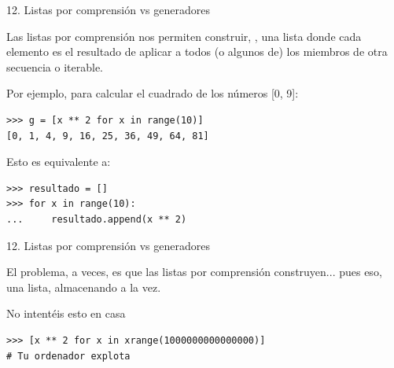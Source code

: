 \documentclass[14pt]{beamer}
\begin{document}
\begin{frame}[fragile]
  {\large 12. Listas por comprensión vs generadores}
  \begin{block}{}
    \small
    \centering
    Las listas por comprensión nos permiten construir, , una lista donde cada elemento es el resultado de
    aplicar  a todos (o algunos de) los
    miembros de otra secuencia o iterable.
  \end{block}

  \footnotesize
  \begin{exampleblock}
    {Por ejemplo, para calcular el cuadrado de los números [0, 9]:}
    \begin{lstlisting}
>>> g = [x ** 2 for x in range(10)]
[0, 1, 4, 9, 16, 25, 36, 49, 64, 81]
    \end{lstlisting}
  \end{exampleblock}

  \begin{exampleblock}
    {Esto es equivalente a:}
    \begin{lstlisting}
>>> resultado = []
>>> for x in range(10):
...     resultado.append(x ** 2)
    \end{lstlisting}
  \end{exampleblock}
\end{frame}

\begin{frame}[fragile]
  {\large 12. Listas por comprensión vs generadores}

  \begin{alertblock}{}
    \centering
    El problema, a veces, es que las listas por comprensión
    construyen... pues eso, una lista, almacenando  a la vez.
  \end{alertblock}

  \footnotesize
  \begin{exampleblock}
    {No intentéis esto en casa}
    \begin{lstlisting}
>>> [x ** 2 for x in xrange(1000000000000000)]
# Tu ordenador explota
    \end{lstlisting}
  \end{exampleblock}
\end{frame}
\end{document}
